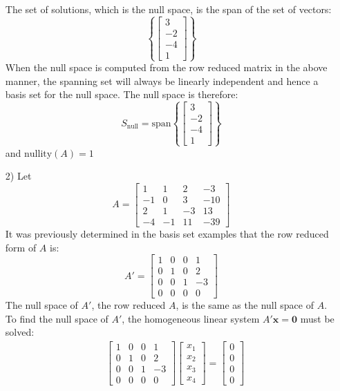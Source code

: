\documentclass{article}
\begin{document}
\begin{itemize}
The set of solutions, which is the null space, is the span of the set of vectors:
\[\left\{\begin{bmatrix} 3 \\ -2 \\ -4 \\ 1\end{bmatrix}\right\}\] 
When the null space is computed from the row reduced matrix in the above manner, the spanning set will always be linearly independent and hence a basis set for the null space. The null space is therefore:
\[S_{\text{null}} = \text{span}\left\{\begin{bmatrix} 3 \\ -2 \\ -4 \\ 1\end{bmatrix}\right\}\]
and \(\text{nullity}(A) = 1\)
\item[2)] Let \[A = \begin{bmatrix}
 1 &   1 &  2  &  -3 \\
-1 &   0 &  3 & -10 \\
 2 &   1 & -3 &  13 \\
-4 & -1 & 11 & -39
\end{bmatrix}\]
It was previously determined in the basis set examples that the row reduced form of \(A\) is:
\[A' = \begin{bmatrix}
1 & 0 & 0 &  1 \\
0 & 1 & 0 &  2 \\
0 & 0 & 1 & -3 \\
0 & 0 & 0 &  0
\end{bmatrix}\]
The null space of \(A'\), the row reduced \(A\), is the same as the null space of \(A\). To find the null space of \(A'\), the homogeneous linear system \(A'\mathbf{x} = \mathbf{0}\) must be solved:
\begin{align*}
& \begin{bmatrix}
1 & 0 & 0 &  1 \\
0 & 1 & 0 &  2 \\
0 & 0 & 1 & -3 \\
0 & 0 & 0 &  0
\end{bmatrix}\begin{bmatrix} x_1 \\ x_2 \\ x_3 \\ x_4 \end{bmatrix} = \begin{bmatrix} 0 \\ 0 \\ 0 \\ 0 \end{bmatrix} 

\end{align*}
\end{itemize}
\end{document}
